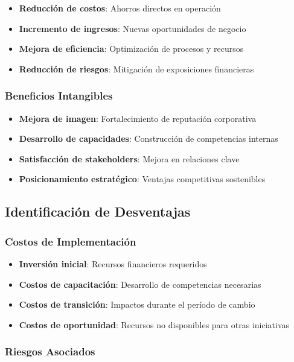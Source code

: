 \documentclass[12pt,letterpaper,oneside]{book}
\begin{document}
\begin{itemize}
\item \textbf{Reducción de costos}: Ahorros directos en operación
\item \textbf{Incremento de ingresos}: Nuevas oportunidades de negocio
\item \textbf{Mejora de eficiencia}: Optimización de procesos y recursos
\item \textbf{Reducción de riesgos}: Mitigación de exposiciones financieras
\end{itemize}

\subsubsection{Beneficios Intangibles}

\begin{itemize}
\item \textbf{Mejora de imagen}: Fortalecimiento de reputación corporativa
\item \textbf{Desarrollo de capacidades}: Construcción de competencias internas
\item \textbf{Satisfacción de stakeholders}: Mejora en relaciones clave
\item \textbf{Posicionamiento estratégico}: Ventajas competitivas sostenibles
\end{itemize}

\subsection{Identificación de Desventajas}

\subsubsection{Costos de Implementación}

\begin{itemize}
\item \textbf{Inversión inicial}: Recursos financieros requeridos
\item \textbf{Costos de capacitación}: Desarrollo de competencias necesarias
\item \textbf{Costos de transición}: Impactos durante el período de cambio
\item \textbf{Costos de oportunidad}: Recursos no disponibles para otras iniciativas
\end{itemize}

\subsubsection{Riesgos Asociados}
\end{document}
